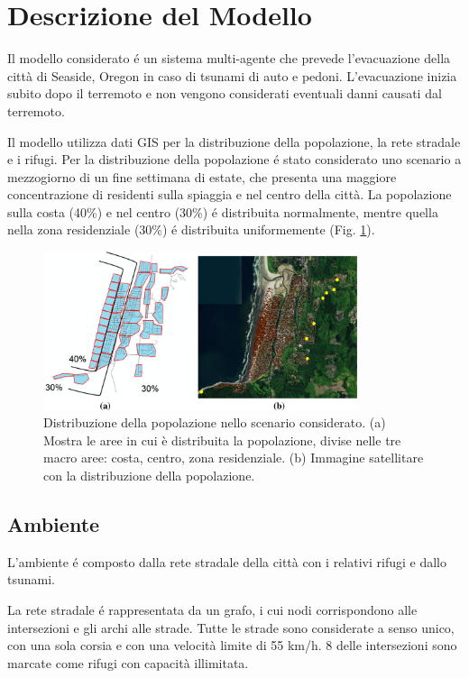 \section{Descrizione del Modello}
\label{sec:modello}
Il modello considerato \parencite{mostafizi2019agent} é un sistema multi-agente che prevede l'evacuazione della città di Seaside, Oregon in caso di tsunami di auto e pedoni.
%
L'evacuazione inizia subito dopo il terremoto e non vengono considerati eventuali danni causati dal terremoto.

Il modello utilizza dati GIS per la distribuzione della popolazione, la rete stradale e i rifugi.
%
Per la distribuzione della popolazione é stato considerato uno scenario a mezzogiorno di un fine settimana di estate,
che presenta una maggiore concentrazione di residenti sulla spiaggia e nel centro della città.
La popolazione sulla costa (40\%) e nel centro (30\%) é distribuita normalmente,
mentre quella nella zona residenziale (30\%) é distribuita uniformemente (Fig. \ref{fig:population}).

\begin{figure}[ht]
  \centering
  \includegraphics[width=0.82\textwidth]{images/population}
  \caption{Distribuzione della popolazione nello scenario considerato.
    (a) Mostra le aree in cui è distribuita la popolazione, divise nelle tre macro aree: costa, centro, zona residenziale.
    (b) Immagine satellitare con la distribuzione della popolazione.}
  \label{fig:population}
\end{figure}

\subsection{Ambiente}
L'ambiente é composto dalla rete stradale della città con i relativi rifugi e dallo tsunami.

La rete stradale é rappresentata da un grafo, i cui nodi corrispondono alle intersezioni e gli archi alle strade.
Tutte le strade sono considerate a senso unico, con una sola corsia e con una velocità limite di 55 km/h.
8 delle intersezioni sono marcate come rifugi con capacità illimitata.

